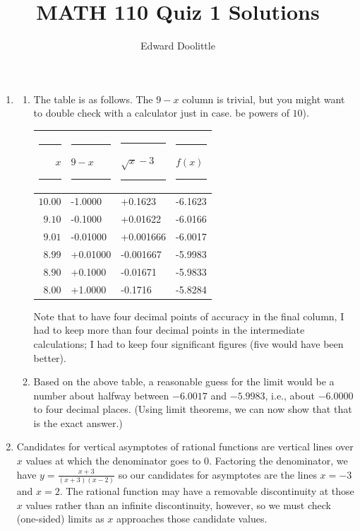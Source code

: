 \documentclass{article}
\title{MATH 110 Quiz 1 Solutions}
\author{Edward Doolittle}
\newcommand{\ds}{\displaystyle}
\begin{document}
\maketitle
\begin{enumerate}
\item
  \begin{enumerate}
  \item The table is as follows.  The $9-x$ column is trivial,
    but you might want to double check with a calculator just in case.
    be powers of $10$).
    \begin{center}
      \begin{tabular}{|r|l|l|l|}
        \hline
	\rule{10pt}{0pt}$x$\rule{10pt}{0pt}     
	  & \rule{10pt}{0pt}$9-x$\rule{10pt}{0pt}
	  & \rule{10pt}{0pt}\rule{0pt}{12pt}$\sqrt{x}-3$\rule{10pt}{0pt}
	  & \rule{20pt}{0pt}$f(x)$\rule{20pt}{0pt} \\
	\hline
	\rule{0pt}{12pt}$10.00$ &   -1.0000    &+0.1623    &  -6.1623   \\
	\hline
	\rule{0pt}{12pt} $9.10$ &   -0.1000    &+0.01622   &  -6.0166   \\
	\hline
	\rule{0pt}{12pt} $9.01$ &   -0.01000   &+0.001666  &  -6.0017   \\
	\hline
	\rule{0pt}{12pt} $8.99$ &   +0.01000   &-0.001667  &  -5.9983   \\
	\hline
	\rule{0pt}{12pt} $8.90$ &   +0.1000    &-0.01671   &  -5.9833   \\
	\hline
	\rule{0pt}{12pt} $8.00$ &   +1.0000    &-0.1716    &  -5.8284   \\
	\hline
      \end{tabular}
    \end{center}
    Note that to have four decimal points of accuracy in the final column,
    I had to keep more than four decimal points in the intermediate 
    calculations; I had to keep four significant figures (five would have
    been better).
  \item %
    Based on the above table, a reasonable guess for the limit would be
    a number about halfway between $-6.0017$ and $-5.9983$, i.e., about
    $-6.0000$ to four decimal places.  (Using limit theorems, we can now
    show that that is the exact answer.)
  \end{enumerate}
\item %
  Candidates for vertical asymptotes of rational functions 
  are vertical lines over $x$ values at which the denominator goes to $0$.
  Factoring the denominator, we have $\ds y = \frac{x+3}{(x+3)(x-2)}$ so
  our candidates for asymptotes are the lines $x=-3$ and $x=2$.  The
  rational function may have a removable discontinuity at those $x$ values
  rather than an infinite discontinuity, however, so we must check (one-sided)
  limits as $x$ approaches those candidate values.  


\end{enumerate}
\end{document}
